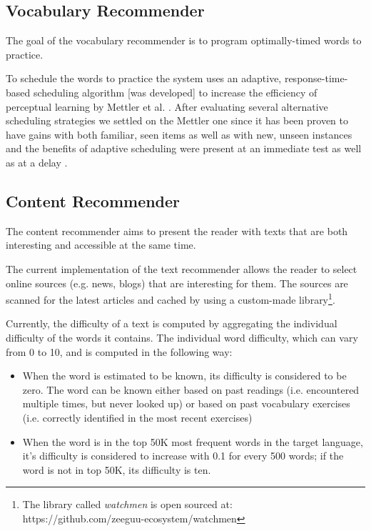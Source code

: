 
\subsection{Vocabulary Recommender}

The goal of the vocabulary recommender is to program optimally-timed words to practice. 

To schedule the words to practice the system uses an adaptive, response-time-based scheduling algorithm [was developed] to increase the efficiency of perceptual learning by Mettler et al. \cite{Mettler14-ARTS}. After evaluating several alternative scheduling strategies we settled on the Mettler one since it has been proven to have gains with both familiar, seen items as well as with new, unseen instances and the benefits of adaptive scheduling were present at an immediate test as well as at a delay \cite{Mettler14-ARTS}.


\subsection{Content Recommender}

The content recommender aims to present the reader with texts that are both interesting and accessible at the same time.

The current implementation of the text recommender allows the reader to select online sources (e.g. news, blogs) that are interesting for them. The sources are scanned for the latest articles and cached by using a custom-made library\footnote{The library called {\em watchmen} is open sourced at:\\ https://github.com/zeeguu-ecosystem/watchmen}. 

Currently, the difficulty of a text is computed by aggregating the individual difficulty of the words it contains. The individual word difficulty, which can vary from 0 to 10, and is computed in the following way: 

\begin{itemize}
	\item When the word is estimated to be known, its difficulty is considered to be zero. The word can be known either based on past readings (i.e. encountered multiple times, but never looked up) or based on past vocabulary exercises (i.e. correctly identified in the most recent exercises) 
	\item When the word is in the top 50K most frequent words in the target language, it's difficulty is 	considered to increase with 0.1 for every 500 words; if the word is not in top 50K, its difficulty is ten.
\end{itemize}

